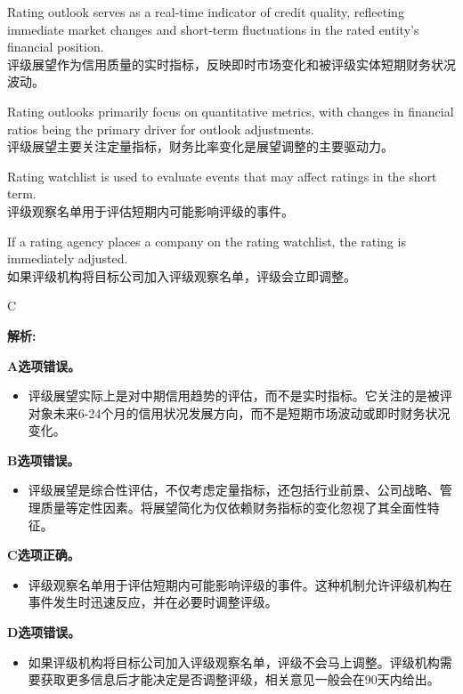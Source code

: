\documentclass{article}
\newenvironment{explanation}
{\textbf{解析:}\par}
{\par}
\begin{document}
\begin{choices}
    \item Rating outlook serves as a real-time indicator of credit quality, reflecting immediate market changes and short-term fluctuations in the rated entity's financial position.\\
    评级展望作为信用质量的实时指标，反映即时市场变化和被评级实体短期财务状况波动。
    
    \item Rating outlooks primarily focus on quantitative metrics, with changes in financial ratios being the primary driver for outlook adjustments.\\
    评级展望主要关注定量指标，财务比率变化是展望调整的主要驱动力。
    
    \item Rating watchlist is used to evaluate events that may affect ratings in the short term.\\
    评级观察名单用于评估短期内可能影响评级的事件。
    
    \item If a rating agency places a company on the rating watchlist, the rating is immediately adjusted.\\
    如果评级机构将目标公司加入评级观察名单，评级会立即调整。
\end{choices}

\begin{correctanswer}
    C
\end{correctanswer}

\begin{explanation}
    \textbf{A选项错误。}
    \begin{itemize}
        \item 评级展望实际上是对中期信用趋势的评估，而不是实时指标。它关注的是被评对象未来6-24个月的信用状况发展方向，而不是短期市场波动或即时财务状况变化。
    \end{itemize}

    \textbf{B选项错误。}
    \begin{itemize}
        \item 评级展望是综合性评估，不仅考虑定量指标，还包括行业前景、公司战略、管理质量等定性因素。将展望简化为仅依赖财务指标的变化忽视了其全面性特征。
    \end{itemize}

    \textbf{C选项正确。}
    \begin{itemize}
        \item 评级观察名单用于评估短期内可能影响评级的事件。这种机制允许评级机构在事件发生时迅速反应，并在必要时调整评级。
    \end{itemize}

    \textbf{D选项错误。}
    \begin{itemize}
        \item 如果评级机构将目标公司加入评级观察名单，评级不会马上调整。评级机构需要获取更多信息后才能决定是否调整评级，相关意见一般会在90天内给出。
    \end{itemize}
\end{explanation}
\end{document}
